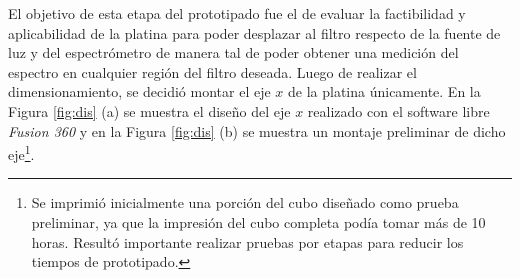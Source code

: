 El objetivo de esta etapa del prototipado fue el de evaluar la factibilidad y aplicabilidad de la platina para poder desplazar al filtro respecto de la fuente de luz y del espectrómetro de manera tal de poder obtener una medición del espectro en cualquier región del filtro deseada. Luego de realizar el dimensionamiento, se decidió montar el eje $\textit{x}$ de la platina únicamente. En la Figura \ref{fig:dis} (a) se muestra el diseño del eje $\textit{x}$ realizado con el software libre \textit{Fusion 360} y en la Figura \ref{fig:dis} (b) se muestra un montaje preliminar de dicho eje\footnote{Se imprimió inicialmente una porción del cubo diseñado como prueba preliminar, ya que la impresión del cubo completa podía tomar más de 10 horas. Resultó importante realizar pruebas por etapas para reducir los tiempos de prototipado.}. 

